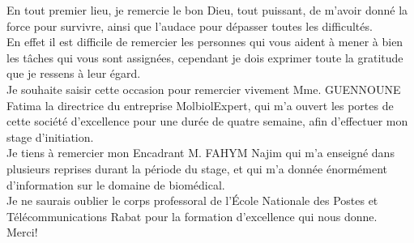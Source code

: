 
\usetikzlibrary{fadings,backgrounds}


\thispagestyle{empty}
%
\vfill 
\begin{center}
	\parbox{.77\linewidth}{  \centering 
		\baselineskip=8mm 
		\selectfont 
		\Large 
		En tout premier lieu, je remercie le bon Dieu, tout puissant, de m’avoir donné
		la force pour survivre, ainsi que l’audace pour dépasser toutes les difficultés.
		\\[5mm]
		En effet il est difficile de remercier les personnes qui vous aident à mener à
		bien les tâches qui vous sont assignées, cependant je dois exprimer toute la
		gratitude que je ressens à leur égard.
		\\[5mm]
		Je souhaite saisir cette occasion pour remercier vivement Mme. GUENNOUNE
		Fatima la directrice du entreprise MolbiolExpert, qui m’a ouvert les portes de
		cette société d’excellence pour une durée de quatre semaine, afin d’effectuer mon stage d’initiation.
		\\[5mm]
		Je tiens à remercier mon Encadrant M. FAHYM Najim qui m’a enseigné dans
		plusieurs reprises durant la période du stage, et qui m’a donnée énormément
		d’information sur le domaine de biomédical.
		\\[5mm]
		Je ne saurais oublier le corps professoral de l’École Nationale des Postes et
		Télécommunications Rabat pour la formation d’excellence qui nous donne.
		\\[5mm]
		Merci!}
\end{center}
\vfill 
\vskip11mm
\newpage